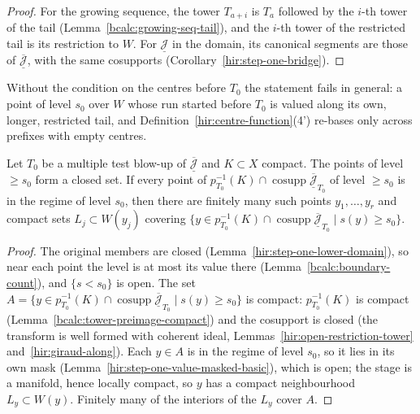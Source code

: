 \begin{proof}
For the growing sequence, the tower \(T_{a+i}\) is \(T_a\) followed by the \(i\)-th tower of the tail (Lemma~\ref{bcalc:growing-seq-tail}), and the \(i\)-th tower of the restricted
tail is its restriction to \(W\). For \(\underline{\mathcal J}\) in the domain, its canonical segments are those of \(\overline{\underline{\mathcal J}}\), with the same cosupports
(Corollary~\ref{hir:step-one-bridge}).
\end{proof}
Without the condition on the centres before \(T_0\) the statement fails in general: a point of level \(s_0\) over \(W\) whose run started before \(T_0\) is valued along its own,
longer, restricted tail, and Definition~\ref{hir:centre-function}(4') re-bases only across prefixes with empty centres.

\begin{lemma}
\label{mc:step-one-phase-cover}
\leanok
Let \(T_0\) be a multiple test blow-up of \(\overline{\underline{\mathcal J}}\) and \(K\subset X\) compact. The points of level \(\ge s_0\) form a closed set. If every point of
\(p_{T_0}^{-1}(K)\cap\operatorname{cosupp}\overline{\underline{\mathcal J}}_{T_0}\) of level \(\ge s_0\) is in the regime of level \(s_0\), then there are finitely many such points
\(y_1,\dots,y_r\) and compact sets \(L_j\subset W(y_j)\) covering \(\{y\in p_{T_0}^{-1}(K)\cap\operatorname{cosupp}\overline{\underline{\mathcal J}}_{T_0}\mid s(y)\ge s_0\}\).
\end{lemma}
\begin{proof}
\leanok
The original members are closed (Lemma~\ref{hir:step-one-lower-domain}), so near each point the level is at most its value there (Lemma~\ref{bcalc:boundary-count}), and
\(\{s<s_0\}\) is open. The set \(A=\{y\in p_{T_0}^{-1}(K)\cap\operatorname{cosupp}\overline{\underline{\mathcal J}}_{T_0}\mid s(y)\ge s_0\}\) is compact: \(p_{T_0}^{-1}(K)\) is compact
(Lemma~\ref{bcalc:tower-preimage-compact}) and the cosupport is closed (the transform is well formed with coherent ideal, Lemmas~\ref{hir:open-restriction-tower}
and~\ref{hir:giraud-along}). Each \(y\in A\) is in the regime of level \(s_0\), so it lies in its own mask (Lemma~\ref{hir:step-one-value-masked-basic}), which is open; the stage is
a manifold, hence locally compact, so \(y\) has a compact neighbourhood \(L_y\subset W(y)\). Finitely many of the interiors of the \(L_y\) cover \(A\).
\end{proof}

